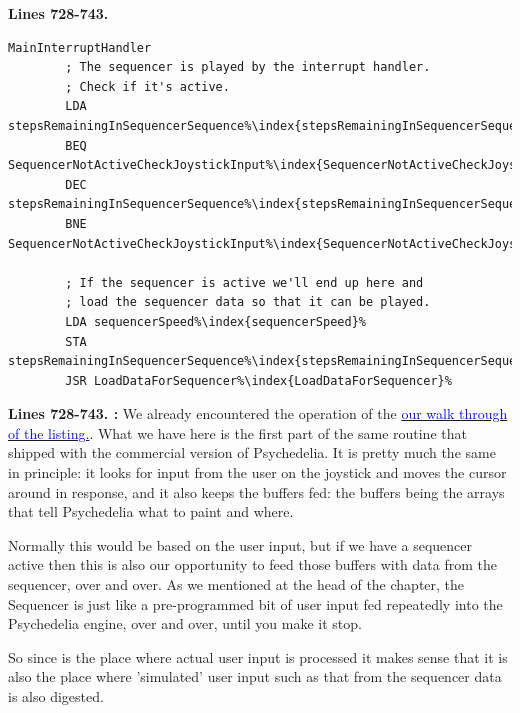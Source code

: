 \clearpage


\textbf{Lines 728-743. }
\begin{lstlisting}[escapechar=\%]
MainInterruptHandler
        ; The sequencer is played by the interrupt handler.
        ; Check if it's active.
        LDA stepsRemainingInSequencerSequence%\index{stepsRemainingInSequencerSequence}%
        BEQ SequencerNotActiveCheckJoystickInput%\index{SequencerNotActiveCheckJoystickInput}%
        DEC stepsRemainingInSequencerSequence%\index{stepsRemainingInSequencerSequence}%
        BNE SequencerNotActiveCheckJoystickInput%\index{SequencerNotActiveCheckJoystickInput}%

        ; If the sequencer is active we'll end up here and
        ; load the sequencer data so that it can be played.
        LDA sequencerSpeed%\index{sequencerSpeed}%
        STA stepsRemainingInSequencerSequence%\index{stepsRemainingInSequencerSequence}%
        JSR LoadDataForSequencer%\index{LoadDataForSequencer}%
\end{lstlisting}

\clearpage

\textbf{Lines 728-743. :} We already encountered the operation of the  
\hyperref[sec:listing_commentary]{\textcolor{blue}{ our walk through of the listing.}}. What we have here is the first part of the same routine
that shipped with the commercial version of Psychedelia. It is pretty much the same in principle: it looks for input from the user on the joystick
and moves the cursor around in response, and it also keeps the buffers fed: the buffers being the arrays that tell Psychedelia what to paint and where.

Normally this would be based on the user input, but if we have a sequencer active then this is also our opportunity to feed those buffers with data from 
the sequencer, over and over. As we mentioned at the head of the chapter, the Sequencer is just like a pre-programmed bit of user input fed repeatedly
into the Psychedelia engine, over and over, until you make it stop. 

So since  is the place where actual user input is processed it makes sense that it is also the place where 'simulated' user
input such as that from the sequencer data is also digested.

